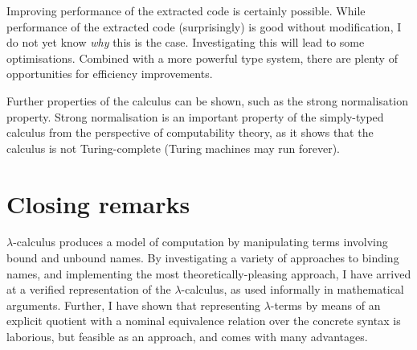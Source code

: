 Improving performance of the extracted code is certainly possible.
While performance of the extracted code (surprisingly) is good without modification, I do not yet know \emph{why} this is the case.
Investigating this will lead to some optimisations.
Combined with a more powerful type system, there are plenty of opportunities for efficiency improvements.

Further properties of the calculus can be shown, such as the strong normalisation property.
Strong normalisation is an important property of the simply-typed calculus from the perspective of computability theory, as it shows that the calculus is not Turing-complete (Turing machines may run forever).

\section{Closing remarks}
\(\lambda\)-calculus produces a model of computation by manipulating terms involving bound and unbound names.
By investigating a variety of approaches to binding names, and implementing the most theoretically-pleasing approach, I have arrived at a verified representation of the \(\lambda\)-calculus, as used informally in mathematical arguments.
Further, I have shown that representing \(\lambda\)-terms by means of an explicit quotient with a nominal equivalence relation over the concrete syntax is laborious, but feasible as an approach, and comes with many advantages.
